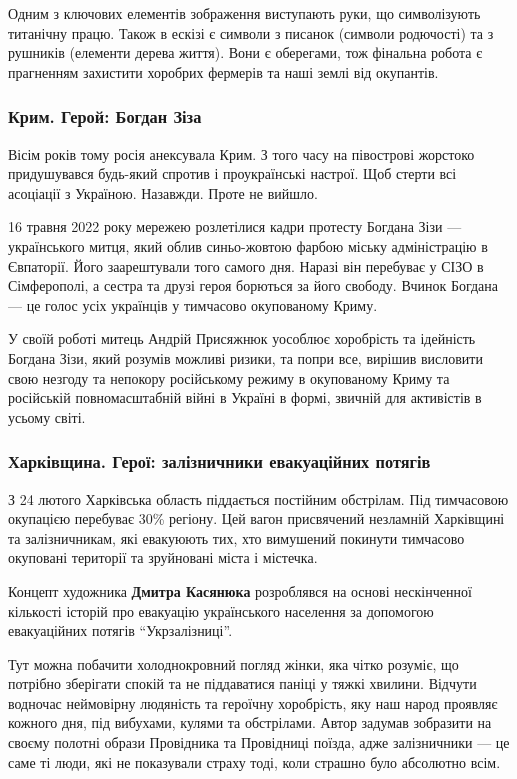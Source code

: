 Одним з ключових елементів зображення виступають руки, що символізують
титанічну працю. Також в ескізі є символи з писанок (символи родючості) та з
рушників (елементи дерева життя). Вони є оберегами, тож фінальна робота є
прагненням захистити хоробрих фермерів та наші землі від окупантів.

\subsubsection{Крим. Герой: Богдан Зіза}

Вісім років тому росія анексувала Крим. З того часу на півострові жорстоко
придушувався будь-який спротив і проукраїнські настрої. Щоб стерти всі
асоціації з Україною. Назавжди. Проте не вийшло.

16 травня 2022 року мережею розлетілися кадри протесту Богдана Зізи —
українського митця, який облив синьо-жовтою фарбою міську адміністрацію в
Євпаторії. Його заарештували того самого дня. Наразі він перебуває у СІЗО в
Сімферополі, а сестра та друзі героя борються за його свободу. Вчинок Богдана —
це голос усіх українців у тимчасово окупованому Криму.


У своїй роботі митець Андрій Присяжнюк уособлює хоробрість та ідейність Богдана
Зізи, який розумів можливі ризики, та попри все, вирішив висловити свою незгоду
та непокору російському режиму в окупованому Криму та російській
повномасштабній війні в Україні в формі, звичній для активістів в усьому світі.

\subsubsection{Харківщина. Герої: залізничники евакуаційних потягів}

З 24 лютого Харківська область піддається постійним обстрілам. Під тимчасовою
окупацією перебуває 30\% регіону. Цей вагон присвячений незламній Харківщині та
залізничникам, які евакуюють тих, хто вимушений покинути тимчасово окуповані
території та зруйновані міста і містечка.


Концепт художника \textbf{Дмитра Касянюка} розроблявся на основі нескінченної кількості
історій про евакуацію українського населення за допомогою евакуаційних потягів
\enquote{Укрзалізниці}.

Тут можна побачити холоднокровний погляд жінки, яка чітко розуміє, що потрібно
зберігати спокій та не піддаватися паніці у тяжкі хвилини. Відчути водночас
неймовірну людяність та героїчну хоробрість, яку наш народ проявляє кожного
дня, під вибухами, кулями та обстрілами. Автор задумав зобразити на своєму
полотні образи Провідника та Провідниці поїзда, адже залізничники — це саме ті
люди, які не показували страху тоді, коли страшно було абсолютно всім. 

